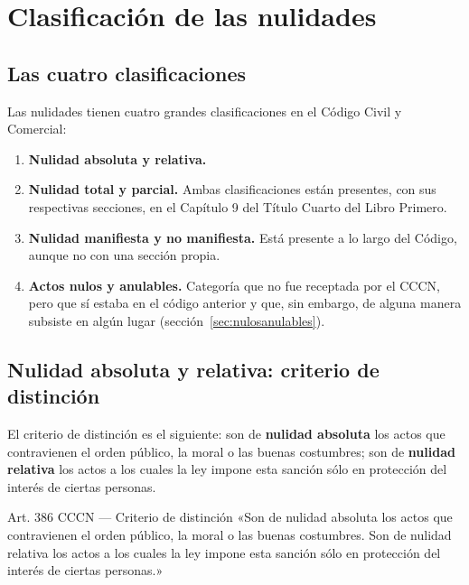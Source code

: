 \documentclass[12pt,oneside]{book}
\begin{document}
\chapter[Clasificación de las nulidades]{Clasificación de las nulidades}

\section{Las cuatro clasificaciones}

Las nulidades tienen cuatro grandes clasificaciones en el Código Civil y Comercial:

\begin{enumerate}
    \item \textbf{Nulidad absoluta y relativa.}
    \item \textbf{Nulidad total y parcial.} Ambas clasificaciones están presentes, con sus respectivas secciones, en el Capítulo 9 del Título Cuarto del Libro Primero.
    \item \textbf{Nulidad manifiesta y no manifiesta.} Está presente a lo largo del Código, aunque no con una sección propia.
    \item \textbf{Actos nulos y anulables.} Categoría que no fue receptada por el CCCN, pero que sí estaba en el código anterior y que, sin embargo, de alguna manera subsiste en algún lugar (sección~\ref{sec:nulosanulables}).
\end{enumerate}

\section{Nulidad absoluta y relativa: criterio de distinción}

El criterio de distinción es el siguiente: son de \textbf{nulidad absoluta} los actos que contravienen el orden público, la moral o las buenas costumbres; son de \textbf{nulidad relativa} los actos a los cuales la ley impone esta sanción sólo en protección del interés de ciertas personas.

\begin{articulo}{Art. 386 CCCN --- Criterio de distinción}
«Son de nulidad absoluta los actos que contravienen el orden público, la moral o las buenas costumbres. Son de nulidad relativa los actos a los cuales la ley impone esta sanción sólo en protección del interés de ciertas personas.»
\end{articulo}
\end{document}
